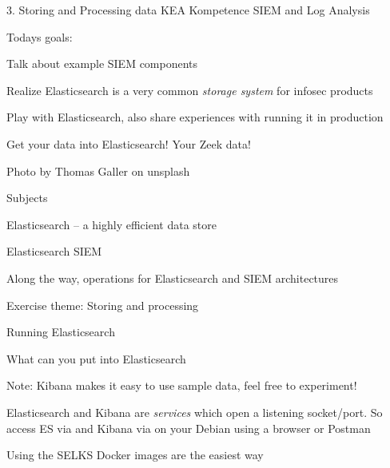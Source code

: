 \documentclass[Screen16to9,17pt]{foils}
\begin{document}
\mytitlepage
{3. Storing and Processing data}
{KEA Kompetence SIEM and Log Analysis}




Todays goals:
\begin{list2}
\item Talk about example SIEM components
\item Realize Elasticsearch is a very common \emph{storage system} for infosec products
\item Play with Elasticsearch, also share experiences with running it in production
\item Get your data into Elasticsearch! Your Zeek data!
\end{list2}

Photo by Thomas Galler on unsplash


\begin{list1}
\item Subjects
\begin{list2}
\item Elasticsearch -- a highly efficient data store
\item Elasticsearch SIEM
\item Along the way, operations for Elasticsearch and SIEM architectures
\end{list2}
\item Exercise theme: Storing and processing
\begin{list2}
\item Running Elasticsearch
\item What can you put into Elasticsearch

\end{list2}
\end{list1}




Note: Kibana makes it easy to use sample data, feel free to experiment!

Elasticsearch and Kibana are \emph{services} which open a listening socket/port. So access ES via  and Kibana via  on your Debian using a browser or Postman

Using the SELKS Docker images are the easiest way
\end{document}
